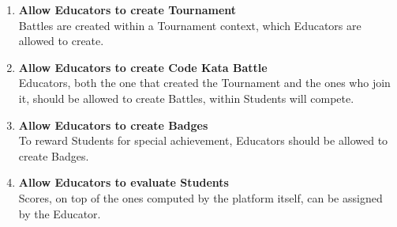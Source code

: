 \documentclass{article}
\begin{document}
\begin{enumerate}[label=$\bullet$ \textbf{GE\arabic*:}]
    \item \textbf{Allow Educators to create Tournament}\\Battles are created within a Tournament context, which Educators are allowed to create.
    \item \textbf{Allow Educators to create Code Kata Battle}\\Educators, both the one that created the Tournament and the ones who join it, should be allowed to create Battles, within Students will compete.
    \item \textbf{Allow Educators to create Badges}\\To reward Students for special achievement, Educators should be allowed to create Badges.
    \item \textbf{Allow Educators to evaluate Students}\\Scores, on top of the ones computed by the platform itself, can be assigned by the Educator.
\end{enumerate}
\end{document}
